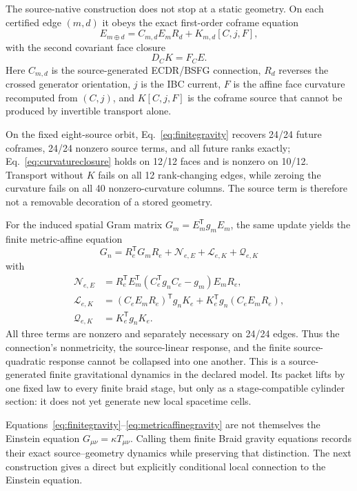 \documentclass[11pt]{article}
\theoremstyle{definition}
\theoremstyle{remark}
\begin{document}
The source-native construction does not stop at a static geometry. On each certified edge $(m,d)$ it obeys the exact first-order coframe equation
\begin{equation}\label{eq:finitegravity}
 E_{m\oplus d}=C_{m,d}E_mR_d+K_{m,d}[C,j,F],
\end{equation}
with the second covariant face closure
\begin{equation}\label{eq:curvatureclosure}
 D_CK=F_CE.
\end{equation}
Here $C_{m,d}$ is the source-generated ECDR/BSFG connection, $R_d$ reverses the crossed generator orientation, $j$ is the IBC current, $F$ is the affine face curvature recomputed from $(C,j)$, and $K[C,j,F]$ is the coframe source that cannot be produced by invertible transport alone.

On the fixed eight-source orbit, Eq.~\eqref{eq:finitegravity} recovers 24/24 future coframes, 24/24 nonzero source terms, and all future ranks exactly; Eq.~\eqref{eq:curvatureclosure} holds on 12/12 faces and is nonzero on 10/12. Transport without $K$ fails on all 12 rank-changing edges, while zeroing the curvature fails on all 40 nonzero-curvature columns. The source term is therefore not a removable decoration of a stored geometry.

For the induced spatial Gram matrix $G_m=E_m^{\mathsf T}g_mE_m$, the same update yields the finite metric-affine equation
\begin{equation}\label{eq:metricaffinegravity}
 \boxed{
 G_n=R_e^{\mathsf T}G_mR_e
 +\mathcal N_{e,E}+\mathcal L_{e,K}+\mathcal Q_{e,K}}
\end{equation}
with
\begin{align}
 \mathcal N_{e,E}
 &=R_e^{\mathsf T}E_m^{\mathsf T}
   (C_e^{\mathsf T}g_nC_e-g_m)E_mR_e,\\
 \mathcal L_{e,K}
 &=(C_eE_mR_e)^{\mathsf T}g_nK_e
   +K_e^{\mathsf T}g_n(C_eE_mR_e),\\
 \mathcal Q_{e,K}&=K_e^{\mathsf T}g_nK_e.
\end{align}
All three terms are nonzero and separately necessary on 24/24 edges. Thus the connection's nonmetricity, the source-linear response, and the finite source-quadratic response cannot be collapsed into one another. This is a source-generated finite gravitational dynamics in the declared model. Its packet lifts by one fixed law to every finite braid stage, but only as a stage-compatible cylinder section: it does not yet generate new local spacetime cells.

Equations~\eqref{eq:finitegravity}--\eqref{eq:metricaffinegravity} are not themselves the Einstein equation $G_{\mu\nu}=\kappa T_{\mu\nu}$. Calling them finite Braid gravity equations records their exact source--geometry dynamics while preserving that distinction. The next construction gives a direct but explicitly conditional local connection to the Einstein equation.
\end{document}
